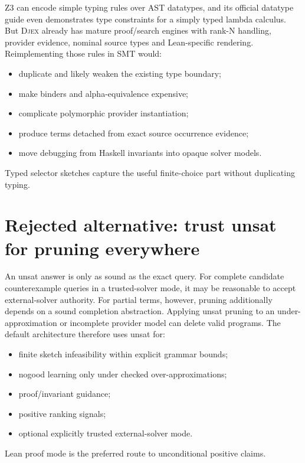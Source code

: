 \documentclass[11pt,oneside]{report}
\newcommand{\Djex}{\textsc{Djex}\xspace}
\begin{document}
Z3 can encode simple typing rules over AST datatypes, and its official datatype guide even demonstrates type constraints for a simply typed lambda calculus. But \Djex already has mature proof/search engines with rank-N handling, provider evidence, nominal source types and Lean-specific rendering. Reimplementing those rules in SMT would:

\begin{itemize}[leftmargin=2em]
\item duplicate and likely weaken the existing type boundary;
\item make binders and alpha-equivalence expensive;
\item complicate polymorphic provider instantiation;
\item produce terms detached from exact source occurrence evidence;
\item move debugging from Haskell invariants into opaque solver models.
\end{itemize}

Typed selector sketches capture the useful finite-choice part without duplicating typing.

\section{Rejected alternative: trust unsat for pruning everywhere}

An unsat answer is only as sound as the exact query. For complete candidate counterexample queries in a trusted-solver mode, it may be reasonable to accept external-solver authority. For partial terms, however, pruning additionally depends on a sound completion abstraction. Applying unsat pruning to an under-approximation or incomplete provider model can delete valid programs. The default architecture therefore uses unsat for:

\begin{itemize}[leftmargin=2em]
\item finite sketch infeasibility within explicit grammar bounds;
\item nogood learning only under checked over-approximations;
\item proof/invariant guidance;
\item positive ranking signals;
\item optional explicitly trusted external-solver mode.
\end{itemize}

Lean proof mode is the preferred route to unconditional positive claims.
\end{document}
